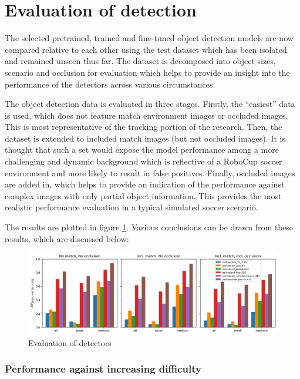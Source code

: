 \documentclass[a4paper,twoside,12pt]{report}
\begin{document}
\section{Evaluation of detection}

The selected pretrained, trained and fine-tuned object detection models are now compared relative to each other using the test dataset which has been isolated and remained unseen thus far. The dataset is decomposed into object sizes, scenario and occlusion for evaluation which helps to provide an insight into the performance of the detectors across various circumstances. 

The object detection data is evaluated in three stages. Firstly, the ``easiest'' data is used, which does not feature match environment images or occluded images. This is most representative of the tracking portion of the research. Then, the dataset is extended to included match images (but not occluded images). It is thought that such a set would expose the model performance among a more challenging and dynamic background which is reflective of a RoboCup soccer environment and more likely to result in false positives. Finally, occluded images are added in, which helps to provide an indication of the performance against complex images with only partial object information. This provides the most realistic performance evaluation in a typical simulated soccer scenario. 

The results are plotted in figure \ref{fig:evaldetect}. Various conclusions can be drawn from these results, which are discussed below:

\begin{figure}[h!]
\begin{center}
\includegraphics[width=15.5cm]{images/eval_detect.png}
\caption{Evaluation of detectors}
\label{fig:evaldetect}
\end{center}
\end{figure}

\subsubsection{Performance against increasing difficulty}
\end{document}
